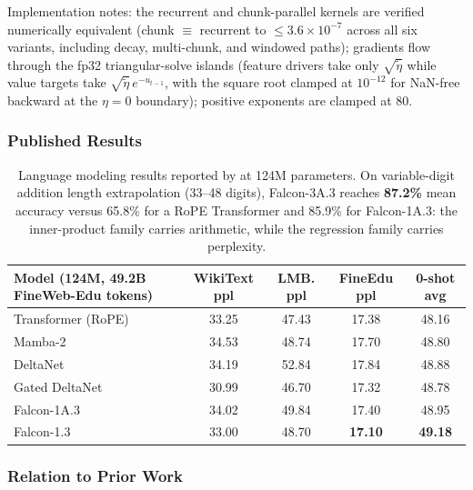 Implementation notes: the recurrent and chunk-parallel kernels are verified numerically equivalent (chunk $\equiv$ recurrent to $\le 3.6 \times 10^{-7}$ across all six variants, including decay, multi-chunk, and windowed paths); gradients flow through the fp32 triangular-solve islands (feature drivers take only $\sqrt{\tilde{\eta}}$ while value targets take $\sqrt{\tilde{\eta}}\, e^{-u_{t-1}}$, with the square root clamped at $10^{-12}$ for NaN-free backward at the $\eta = 0$ boundary); positive exponents are clamped at $80$.

\subsubsection{Published Results}

\begin{table}[H]
\centering
\small
\begin{tabularx}{0.95\linewidth}{Xcccc}
\toprule
\textbf{Model (124M, 49.2B FineWeb-Edu tokens)} & \textbf{WikiText ppl} & \textbf{LMB. ppl} & \textbf{FineEdu ppl} & \textbf{0-shot avg} \\
\midrule
Transformer (RoPE) & 33.25 & 47.43 & 17.38 & 48.16 \\
Mamba-2 & 34.53 & 48.74 & 17.70 & 48.80 \\
DeltaNet & 34.19 & 52.84 & 17.84 & 48.88 \\
Gated DeltaNet & 30.99 & 46.70 & 17.32 & 48.78 \\
Falcon-1A.3 & 34.02 & 49.84 & 17.40 & 48.95 \\
Falcon-1.3 & 33.00 & 48.70 & \textbf{17.10} & \textbf{49.18} \\
\bottomrule
\end{tabularx}
\caption{Language modeling results reported by \citet{zhang_falcon_2026} at 124M parameters. On variable-digit addition length extrapolation (33--48 digits), Falcon-3A.3 reaches \textbf{87.2\%} mean accuracy versus 65.8\% for a RoPE Transformer and 85.9\% for Falcon-1A.3: the inner-product family carries arithmetic, while the regression family carries perplexity.}
\label{tab:falcon-results}
\end{table}

\subsubsection{Relation to Prior Work}

